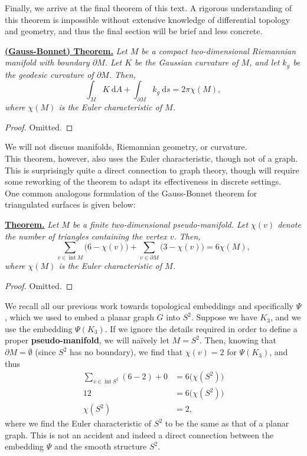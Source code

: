 \documentclass{article}
\begin{document}
\noindent Finally, we arrive at the final theorem of this text\cite{DoCarmo1976}. A rigorous understanding of this theorem is impossible without extensive knowledge of differential topology and geometry, and thus the final section will be brief and less concrete.\\

\begin{bluebox}
\noindent\underline{\textbf{(Gauss-Bonnet) Theorem.}} \textit{Let $M$ be a compact two-dimensional Riemannian manifold with boundary $\partial M$. Let $K$ be the Gaussian curvature of $M$, and let $k_{g}$ be the geodesic curvature of $\partial M$. Then,
\[\int_{M}K\:\mathrm{d}A + \int_{\partial M}k_{g}\:\mathrm{d}s = 2\pi\chi(M),\]
where $\chi(M)$ is the Euler characteristic of $M$.}
\end{bluebox}
\begin{proof}
    Omitted.
\end{proof}

\noindent We will not discuss manifolds, Riemannian geometry, or curvature.\\

\noindent This theorem, however, also uses the Euler characteristic, though not of a graph. This is surprisingly quite a direct connection to graph theory, though will require some reworking of the theorem to adapt its effectiveness in discrete settings.\\

\noindent One common analogous formulation of the Gauss-Bonnet theorem for triangulated surfaces is given below:

\begin{bluebox}
\noindent\underline{\textbf{Theorem.}} \textit{Let $M$ be a finite two-dimensional pseudo-manifold. Let $\chi(v)$ denote the number of triangles containing the vertex $v$. Then,}
\[\sum_{v\in\:\text{int}\:M}\bigl(6-\chi(v)\bigr) + \sum_{v\in\partial M}\bigl(3-\chi(v)\bigr) = 6\chi(M),\]
\textit{where $\chi(M)$ is the Euler characteristic of $M$.}
\end{bluebox}
\begin{proof}
    Omitted.
\end{proof}

\noindent We recall all our previous work towards topological embeddings and specifically $\Psi$, which we used to embed a planar graph $G$ into $S^{2}$. Suppose we have $K_{3}$, and we use the embedding $\Psi(K_{3})$. If we ignore the details required in order to define a proper \textbf{pseudo-manifold}, we will naïvely let $M = S^{2}$. Then, knowing that $\partial M = \emptyset$ (since $S^{2}$ has no boundary), we find that $\chi(v) = 2$ for $\Psi(K_{3})$, and thus
\begin{align*}
    \sum_{v\in\:\text{int}\:S^{2}}(6 - 2) + 0 &= 6\bigl(\chi(S^{2})\bigr)\\
    12 &= 6\bigl(\chi(S^{2})\bigr)\\
    \chi(S^{2}) &= 2,
\end{align*}
where we find the Euler characteristic of $S^{2}$ to be the same as that of a planar graph. This is not an accident and indeed a direct connection between the embedding $\Psi$ and the smooth structure $S^{2}$.\\
\end{document}

